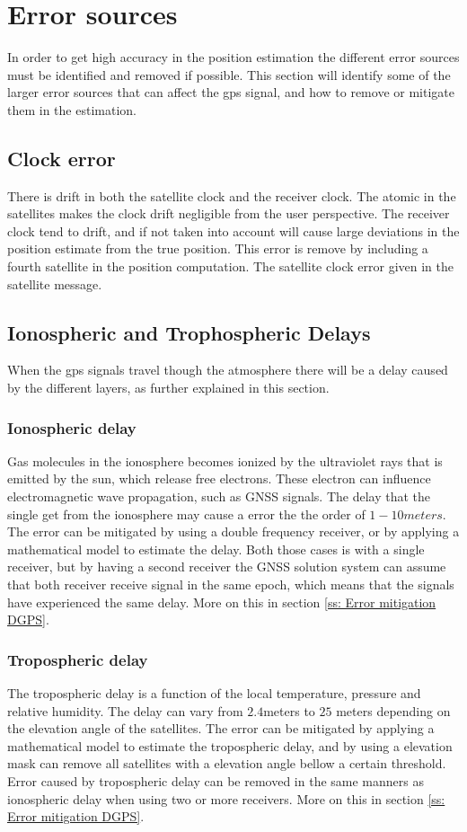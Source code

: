 \section{Error sources}
In order to get high accuracy in the position estimation the different error sources must be identified and removed if possible. This section will identify some of the larger error sources that can affect the \gls{gps} signal, and how to remove or mitigate them in the estimation.
\subsection{Clock error}
There is drift in both the satellite clock and the receiver clock. The atomic in the satellites makes the clock drift negligible from the user perspective. The receiver clock tend to drift, and if not taken into account will cause large deviations in the position estimate from the true position. This error is remove by including a fourth satellite in the position computation. The satellite clock error given in the satellite message. 

\subsection{Ionospheric and Trophospheric Delays}
When the \gls{gps} signals travel though the atmosphere there will be a delay caused by the different layers, as further explained in this section.
\subsubsection{Ionospheric delay}
Gas molecules in the ionosphere becomes ionized by the ultraviolet rays that is emitted by the sun, which release free electrons. These electron can influence electromagnetic wave propagation, such as GNSS signals. The delay that the single get from the ionosphere may cause a error the the order of $1-10 meters$. The error can be mitigated by using a double frequency receiver, or by applying a mathematical model to estimate the delay. Both those cases is with a single receiver, but by having a second receiver the GNSS solution system can assume that both receiver receive signal in the same epoch, which means that the signals have experienced the same delay. More on this in section \ref{ss: Error mitigation DGPS}.

\subsubsection{Tropospheric delay}
The tropospheric delay is a function of the local temperature, pressure and relative humidity. The delay can vary from $2.4$meters to $25$ meters depending on the elevation angle of the satellites. The error can be mitigated by applying a mathematical model to estimate the tropospheric delay, and by using a elevation mask can remove all satellites with a elevation angle bellow a certain threshold. Error caused by tropospheric delay can be removed in the same manners as ionospheric delay when using two or more receivers. More on this in section \ref{ss: Error mitigation DGPS}.

